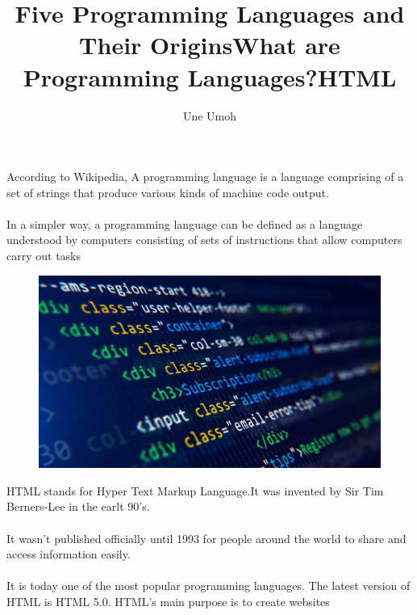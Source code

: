 \documentclass{article}
\title{Five Programming Languages and Their Origins}
\author{Une Umoh}
\begin{document}
	\maketitle
	\newpage
	
	\title{What are Programming Languages?}
	\maketitle
	
	According to Wikipedia, A programming language is a language comprising of a set of strings that produce various kinds of machine code output. 
	\paragraph{}
	In a simpler way, a programming language can be defined as a language understood by computers consisting of sets of instructions that allow computers carry out tasks
	\newpage
	
	\title{HTML}
	\maketitle
	\begin{figure}
	\includegraphics[width=\linewidth]{html.jpeg}
		\label{html.01}
	\end{figure}

	\newpage
	HTML stands for Hyper Text Markup Language.It was invented by Sir Tim Berners-Lee in the earlt 90's.
	\paragraph{}
	It wasn't published officially until 1993 for people around the world to share and access information easily.
	\paragraph{}
	It is today one of the most popular programming languages. The latest version of HTML is HTML 5.0. HTML's main purpose is to create websites
\end{document}
